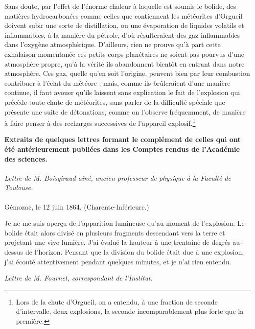 \documentclass[a4paper, 11pt, oneside, polutonikogreek, french]{article}
\begin{document}
Sans doute, par l'effet de l'énorme chaleur à laquelle est soumis le bolide, des matières hydrocarbonées comme celles que contiennent les météorites d'Orgueil doivent subir une sorte de distillation, ou une évaporation de liquides volatils et inflammables, à la manière du pétrole, d'où résulteraient des gaz inflammables dans l'oxygène atmosphérique. D'ailleurs, rien ne prouve qu'à part cette exhalaison momentanée ces petits corps planétaires ne soient pas pourvus d'une atmosphère propre, qu'à la vérité ils abandonnent bientôt en entrant dans notre atmosphère. Ces gaz, quelle qu'en soit l'origine, peuvent bien par leur combustion contribuer à l'éclat du météore ; mais, comme ils brûleraient d'une manière continue, il faut avouer qu'ils laissent sans explication le fait de l'explosion qui précède toute chute de météorites, sans parler de la difficulté spéciale que présente une suite de détonations, comme on l'observe fréquemment, de manière à faire penser à des recharges successives de l'appareil explosif.\footnote{Lors de la chute d'Orgueil, on a entendu, à une fraction de seconde d'intervalle, deux explosions, la seconde incomparablement plus forte que la première.}
\clearpage
\begin{center}
\textbf{Extraits de quelques lettres formant le complément de celles qui ont été antérieurement publiées dans les Comptes rendus de l'Académie des sciences.}
\end{center}
\paragraph{}
\begin{center}
\emph{Lettre de M. Boisgiraud aîné, ancien professeur de physique à la Faculté de Toulouse.}
\end{center}
\paragraph{}
Gémozac, le 12 juin 1864. (Charente-Inférieure.)

Je ne me suis aperçu de l'apparition lumineuse qu'au moment de l'explosion. Le bolide était alors divisé en plusieurs fragments descendant vers la terre et projetant une vive lumière. J'ai évalué la hauteur à une trentaine de degrés au-dessus de l'horizon. Pensant que la division du bolide était due à une explosion, j'ai écouté attentivement pendant quelques minutes, et je n'ai rien entendu.
\begin{center}
\emph{Lettre de M. Fournet, correspondant de l'Institut.}
\end{center}
\end{document}

